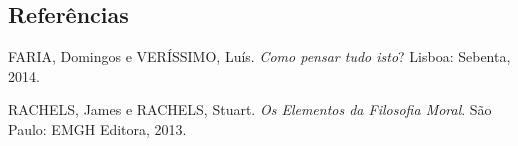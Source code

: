 \documentclass[
	article,			%
	12pt,				%
	twoside,			%
	a4paper,			%
	english,			%
	brazil,				%
	sumario=tradicional
]{plano}
\begin{document}
\fi


\begin{snugshade}
	\section{Referências} %
\end{snugshade}


	 FARIA, Domingos e VERÍSSIMO, Luís. \textit{Como pensar tudo isto}? Lisboa: Sebenta, 2014.

	 RACHELS, James e RACHELS, Stuart. \textit{Os Elementos da Filosofia Moral}. São Paulo: EMGH Editora, 2013.
















\end{document}
